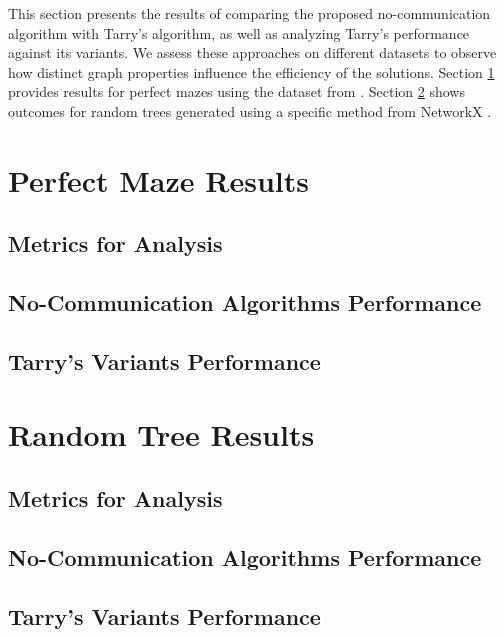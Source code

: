 This section presents the results of comparing the proposed no-communication algorithm with Tarry's algorithm, as well as analyzing Tarry's performance against its variants. We assess these approaches on different datasets to observe how distinct graph properties influence the efficiency of the solutions. Section \ref{section_result_perfect_maze} provides results for perfect mazes using the dataset from . Section \ref{section_result_random_tree} shows outcomes for random trees generated using a specific method from NetworkX \cite{Hagberg2008}.

\section{Perfect Maze Results}
\label{section_result_perfect_maze}

\subsection{Metrics for Analysis}
\label{subsection_maze_metrics_analysis}

\subsection{No-Communication Algorithms Performance} 
\label{subsection_maze_no_comm}

\subsection{Tarry's Variants Performance} 
\label{subsection_maze_tarry_variants}


\section{Random Tree Results}
\label{section_result_random_tree}

\subsection{Metrics for Analysis}
\label{subsection_random_tree_metrics}

\subsection{No-Communication Algorithms Performance} \label{subsection_random_tree_no_comm}

\subsection{Tarry's Variants Performance} 
\label{subsection_random_tree_tarry_variants}


    
    
    
    
    
